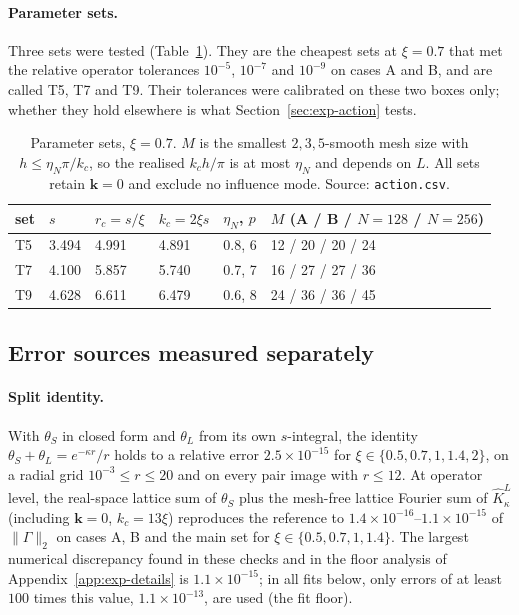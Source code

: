 \documentclass[11pt]{article}
\theoremstyle{plain}
\newcommand{\kk}{\bm k}
\DeclareRobustCommand{\_}{\textunderscore\allowbreak}
\begin{document}
\paragraph{Parameter sets.}
Three sets were tested (Table~\ref{tab:exp-params}). They are the cheapest sets
at $\xi=0.7$ that met the relative operator tolerances $10^{-5}$, $10^{-7}$ and
$10^{-9}$ on cases A and B, and are called T5, T7 and T9. Their tolerances
were calibrated on these two boxes only; whether they hold elsewhere is what
Section~\ref{sec:exp-action} tests.

\begin{table}[htbp]
\centering
\small
\begin{tabular}{llllll}
\toprule
set & $s$ & $r_c=s/\xi$ & $k_c=2\xi s$ & $\eta_N$, $p$ & $M$ (A / B / $N=128$ / $N=256$) \\
\midrule
T5 & 3.494 & 4.991 & 4.891 & 0.8, 6 & 12 / 20 / 20 / 24 \\
T7 & 4.100 & 5.857 & 5.740 & 0.7, 7 & 16 / 27 / 27 / 36 \\
T9 & 4.628 & 6.611 & 6.479 & 0.6, 8 & 24 / 36 / 36 / 45 \\
\bottomrule
\end{tabular}
\caption{Parameter sets, $\xi=0.7$. $M$ is the smallest $2,3,5$-smooth mesh size with $h\le\eta_N\pi/k_c$, so the
realised $k_ch/\pi$ is at most $\eta_N$ and depends on $L$. All sets retain $\kk=0$ and exclude no influence mode.
Source: \texttt{action.csv}.}
\label{tab:exp-params}
\end{table}

\subsection{Error sources measured separately}
\label{sec:exp-components}

\paragraph{Split identity.}
With $\theta_S$ in closed form and $\theta_L$ from its own $s$-integral, the
identity $\theta_S+\theta_L=e^{-\kappa r}/r$ holds to a relative error
$2.5\times10^{-15}$ for $\xi\in\{0.5,0.7,1,1.4,2\}$, on a radial grid
$10^{-3}\le r\le20$ and on every pair image with $r\le12$. At operator
level, the real-space lattice sum of $\theta_S$ plus the mesh-free lattice
Fourier sum of $\widehat K_\kappa^L$ (including $\kk=0$, $k_c=13\xi$)
reproduces the reference to $1.4\times10^{-16}$--$1.1\times10^{-15}$ of
$\|\Gamma\|_2$ on cases A, B and the main set for $\xi\in\{0.5,0.7,1,1.4\}$.
The largest numerical discrepancy found in these checks and in the floor
analysis of Appendix~\ref{app:exp-details} is $1.1\times10^{-15}$; in all fits
below, only errors of at least $100$ times this value,
$1.1\times10^{-13}$, are used (the fit floor).
\end{document}
